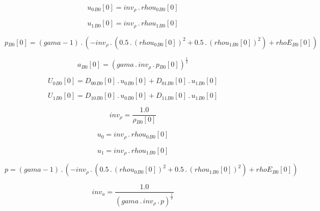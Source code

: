 \documentclass{article}
\begin{document}
\begin{dmath}{u_{0}{_{B0}}}[{0}] = inv_{\rho} \,.\, {rhou_{0}{_{B0}}}[{0}]\end{dmath}

\begin{dmath}{u_{1}{_{B0}}}[{0}] = inv_{\rho} \,.\, {rhou_{1}{_{B0}}}[{0}]\end{dmath}

\begin{dmath}{p{_{B0}}}[{0}] = \left(gama - 1\right) \,.\, \left(- inv_{\rho} \,.\, \left(0.5 \,.\, \left({rhou_{0}{_{B0}}}[{0}] \right)^{2} + 0.5 \,.\, \left({rhou_{1}{_{B0}}}[{0}] \right)^{2}\right) + {rhoE{_{B0}}}[{0}]\right)\end{dmath}

\begin{dmath}{a{_{B0}}}[{0}] = \left(gama \,.\, inv_{\rho} \,.\, {p{_{B0}}}[{0}] \right)^{\frac{1}{2}}\end{dmath}

\begin{dmath}{U_{0}{_{B0}}}[{0}] = {D_{00}{_{B0}}}[{0}] \,.\, {u_{0}{_{B0}}}[{0}] + {D_{01}{_{B0}}}[{0}] \,.\, {u_{1}{_{B0}}}[{0}]\end{dmath}

\begin{dmath}{U_{1}{_{B0}}}[{0}] = {D_{10}{_{B0}}}[{0}] \,.\, {u_{0}{_{B0}}}[{0}] + {D_{11}{_{B0}}}[{0}] \,.\, {u_{1}{_{B0}}}[{0}]\end{dmath}

\begin{dmath}inv_{\rho} = \frac{1.0}{{\rho{_{B0}}}[{0}]}\end{dmath}

\begin{dmath}u_{0} = inv_{\rho} \,.\, {rhou_{0}{_{B0}}}[{0}]\end{dmath}

\begin{dmath}u_{1} = inv_{\rho} \,.\, {rhou_{1}{_{B0}}}[{0}]\end{dmath}

\begin{dmath}p = \left(gama - 1\right) \,.\, \left(- inv_{\rho} \,.\, \left(0.5 \,.\, \left({rhou_{0}{_{B0}}}[{0}] \right)^{2} + 0.5 \,.\, \left({rhou_{1}{_{B0}}}[{0}] \right)^{2}\right) + {rhoE{_{B0}}}[{0}]\right)\end{dmath}

\begin{dmath}inv_{a} = \frac{1.0}{\left(gama \,.\, inv_{\rho} \,.\, p \right)^{\frac{1}{2}}}\end{dmath}
\end{document}
